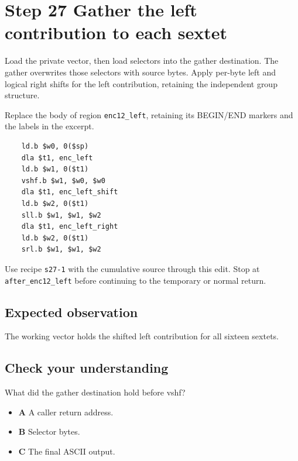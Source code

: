 \section{Step 27 Gather the left contribution to each sextet}\label{base64-s27}

Load the private vector, then load selectors into the gather destination. The gather overwrites those selectors with source bytes. Apply per-byte left and logical right shifts for the left contribution, retaining the independent group structure.

Replace the body of region \texttt{enc12\_left}, retaining its BEGIN/END markers and the labels in the excerpt.

\begin{verbatim}
    ld.b $w0, 0($sp)
    dla $t1, enc_left
    ld.b $w1, 0($t1)
    vshf.b $w1, $w0, $w0
    dla $t1, enc_left_shift
    ld.b $w2, 0($t1)
    sll.b $w1, $w1, $w2
    dla $t1, enc_left_right
    ld.b $w2, 0($t1)
    srl.b $w1, $w1, $w2
\end{verbatim}

Use recipe \texttt{s27-1} with the cumulative source through this edit. Stop at \texttt{after\_enc12\_left} before continuing to the temporary or normal return.

\subsection{Expected observation}
The working vector holds the shifted left contribution for all sixteen sextets.

\subsection{Check your understanding}
What did the gather destination hold before vshf?

\begin{itemize}
  \item \textbf{A} A caller return address.
  \item \textbf{B} Selector bytes.
  \item \textbf{C} The final ASCII output.
\end{itemize}
